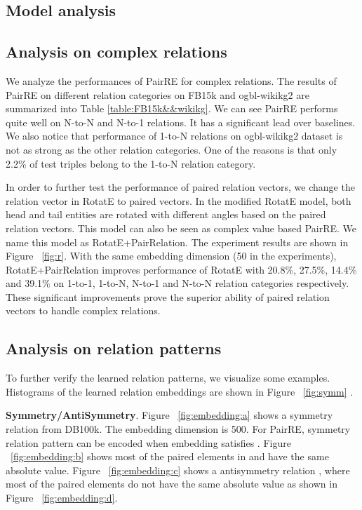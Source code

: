 \documentclass[11pt,a4paper]{article}
\begin{document}
\subsection{Model analysis}

\subsection*{Analysis on complex relations} 

We analyze the performances of PairRE for complex relations.
The results of PairRE on different relation categories on FB15k and ogbl-wikikg2 are summarized into Table \ref{table:FB15k&&wikikg}.
We can see PairRE performs quite well on N-to-N and N-to-1 relations. It has a significant lead over baselines. We also notice that performance of 1-to-N relations on ogbl-wikikg2 dataset is not as strong as the other relation categories. One of the reasons is that only 2.2\% of test triples belong to the 1-to-N relation category.

In order to further test the performance of paired relation vectors, we change the relation vector in RotatE to paired vectors.
In the modified RotatE model, both head and tail entities are rotated with different angles based on the paired relation vectors.  This model can also be seen as complex value based PairRE. We name this model as RotatE+PairRelation. The experiment results are shown in Figure ~\ref{fig:r}.
With the same embedding dimension (50 in the experiments),  RotatE+PairRelation improves performance of RotatE with 20.8\%, 27.5\%, 14.4\% and 39.1\% on 1-to-1, 1-to-N, N-to-1 and N-to-N relation categories respectively. These significant improvements prove the superior ability of  paired relation vectors to handle complex relations.


\subsection*{Analysis on relation patterns}

To further verify the learned relation patterns, we visualize some examples.
Histograms of the learned relation embeddings are shown in Figure ~\ref{fig:symm} .

\textbf{Symmetry/AntiSymmetry}. Figure ~\ref{fig:embedding:a} shows a symmetry relation  from DB100k.
The embedding dimension is 500.
For PairRE, symmetry relation pattern can be encoded when embedding  satisfies .
Figure ~\ref{fig:embedding:b} shows most of the paired elements in  and  have the same absolute value.
Figure ~\ref{fig:embedding:c} shows a antisymmetry relation , where most of the paired elements do not have the same absolute value as shown in Figure ~\ref{fig:embedding:d}.
\end{document}
